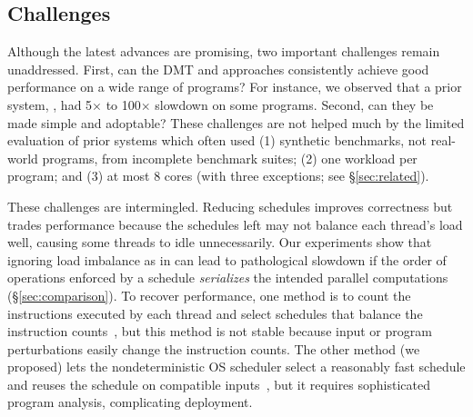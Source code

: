 

\subsection{Challenges}

Although the latest advances are promising, two important challenges remain
unaddressed.  First, can the DMT and \smt approaches consistently achieve
good performance on a wide range of programs?  For instance, we observed
that a prior system, \dthreads, had 5$\times$ to 100$\times$ slowdown on
some programs.  Second, can they be made simple and adoptable?
These challenges are not helped much by the limited
evaluation of prior systems which often used (1) synthetic benchmarks, not
real-world programs, from incomplete benchmark suites; (2) one workload
per program; and (3) at most 8 cores (with three exceptions; see \S\ref{sec:related}).

These challenges are intermingled.  Reducing schedules improves correctness
but trades performance because the schedules left may not balance each
thread's load well, causing some threads to idle unnecessarily.  Our
experiments show that ignoring load imbalance as in \dthreads
can lead to pathological
slowdown if the order of operations enforced by a schedule
\emph{serializes} the intended parallel computations
(\S\ref{sec:comparison}).  To recover performance, one method is to count
the instructions executed by each thread and select schedules that balance
the instruction counts~\cite{kendo:asplos09, coredet:asplos10,
  dmp:asplos09}, but this method is not stable because input or program
perturbations easily change the instruction counts.  The other method (we proposed)
lets the nondeterministic OS scheduler select
a reasonably fast schedule and reuses the schedule on
compatible inputs~\cite{cui:tern:osdi10,peregrine:sosp11}, but it
requires sophisticated program analysis, complicating deployment.

